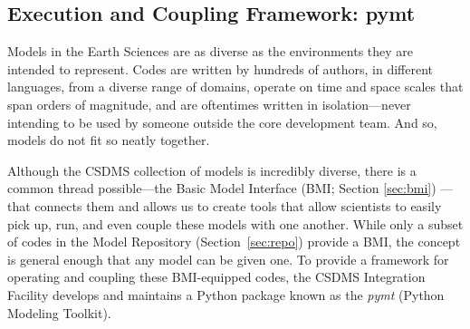 \documentclass{article} %
\begin{document}
\subsection{Execution and Coupling Framework: pymt}
\label{sec:pymt}

Models in the Earth Sciences are as diverse as the environments they are intended to represent.
Codes are written by hundreds of authors, in different languages, from a diverse range of domains,
operate on time and space scales that span orders of magnitude,
and are oftentimes written in isolation---never intending to be used
by someone outside the core development team. And so, models do not fit so neatly together.

Although the CSDMS collection of models is incredibly diverse,
there is a common thread possible---the Basic Model Interface (BMI; Section \ref{sec:bmi})
---that connects them and allows us to
create tools that allow scientists to easily pick up, run,
and even couple these models with one another. While only a subset of codes in the Model Repository (Section~\ref{sec:repo}) provide a BMI, the concept is general enough that
any model can be given one. To provide a framework for operating and coupling these BMI-equipped codes, the CSDMS Integration Facility develops and maintains a Python package known as the \textit{pymt} 
(Python Modeling Toolkit).
\end{document}
